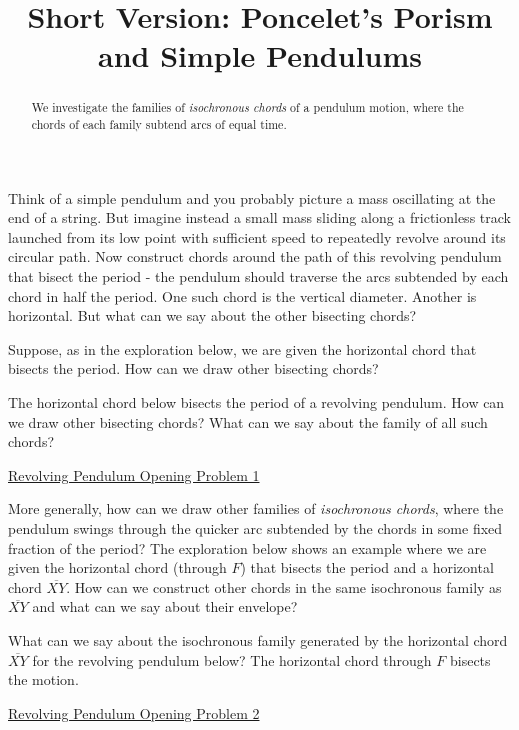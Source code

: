 \documentclass{ximera}
\title{Short Version: Poncelet's Porism and Simple Pendulums}
\begin{document}
\begin{abstract}
We investigate the families of \emph{isochronous chords} of a pendulum motion, where the chords of each family subtend arcs of equal time.
\end{abstract}
\maketitle

Think of a simple pendulum and you probably picture a mass oscillating at the end of a string. But imagine instead a small mass sliding along a frictionless track launched from its low point with sufficient speed to repeatedly revolve around its circular path. Now construct chords around the path of this revolving pendulum that bisect the period - the pendulum should traverse the arcs subtended by each chord in half the period. One such chord is the vertical diameter. Another is horizontal. But what can we say about the other bisecting chords?

Suppose, as in the exploration below, we are given the horizontal chord that bisects the period. How can we draw other bisecting chords?

\begin{exploration}
The horizontal chord below bisects the period of a revolving pendulum. How can we draw other bisecting chords? What can we say about the family of all such chords?

\begin{onlineOnly}
    \begin{center}
\end{center}
\end{onlineOnly}

\href{https://www.desmos.com/calculator/x5fzsfvxdb}{Revolving Pendulum Opening Problem 1}

\end{exploration}


More generally, how can we draw other families of \emph{isochronous chords}, where the pendulum swings through the quicker arc subtended by the chords in some fixed fraction of the period?  The exploration below shows an example where we are given the horizontal chord (through $F$) that bisects the period and a horizontal chord $\overline{XY}$. How can we construct other chords in the same isochronous family as $\overline{XY}$ and what can we say about their envelope? 


\begin{exploration}
What can we say about the isochronous family generated by the horizontal chord $\overline{XY}$ for the revolving pendulum below? The horizontal chord through $F$ bisects the motion.

\begin{onlineOnly}
    \begin{center}
\end{center}
\end{onlineOnly}

\href{https://www.desmos.com/calculator/1kyfdn6yyc}{Revolving Pendulum Opening Problem 2}

\end{exploration}
\end{document}
